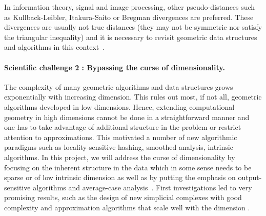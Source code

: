 In information theory, signal and image processing, other pseudo-distances such as Kullback-Leibler, Itakura-Saito or Bregman divergences are preferred.  
These divergences are usually not true distances (they may not be symmetric nor satisfy the triangular inequality) and it is necessary to revisit geometric data structures and algorithms in this context~\cite{geometrica-6154a}.




\paragraph{Scientific challenge 2 :  Bypassing the curse of dimensionality.} 

The complexity of many geometric algorithms and data structures grows exponentially with increasing dimension. %
This rules out most, if not all, geometric algorithms developed in low dimensions.  Hence, extending computational geometry in high dimensions cannot be done in a straightforward manner and one has to take advantage of additional structure in the problem or  restrict attention to approximations. This motivated a number of new algorithmic paradigms such as locality-sensitive hashing, smoothed analysis, intrinsic algorithms.  In this project, we will address the curse of dimensionality by focusing on the inherent structure in the data which in some sense needs to be sparse or of low intrinsic dimension as well as by putting the emphasis on output-sensitive algorithms and average-case analysis~\cite{sl-mwp-2000}.  
First investigations led to very promising results, such as the design of new simplicial complexes with good complexity and approximation algorithms that scale well with the dimension \cite{cds-tewc-2004,geometrica-7142i}.







